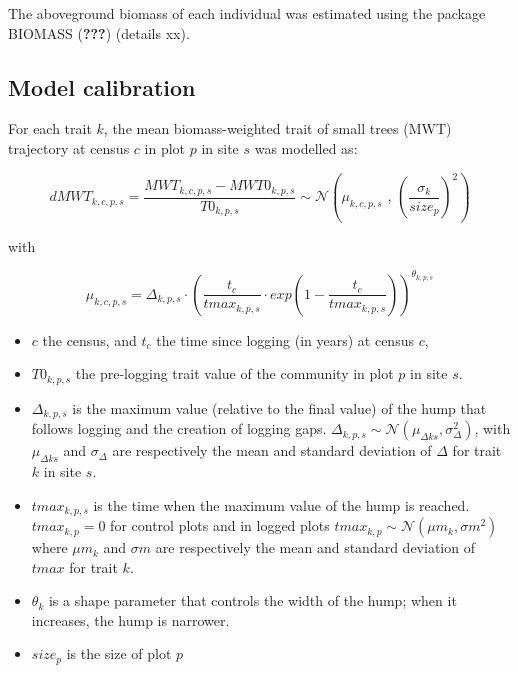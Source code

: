 \documentclass[]{elsarticle} %
\begin{document}
The aboveground biomass of each individual was estimated using the
package BIOMASS ({\textbf{???}}) (details xx).

\subsection{Model calibration}\label{model-calibration}

For each trait \(k\), the mean biomass-weighted trait of small trees
(MWT) trajectory at census \(c\) in plot \(p\) in site \(s\) was
modelled as:

\begin{equation}  
dMWT_{k,c,p,s} = \frac{MWT_{k,c,p,s} - MWT0_{k,p,s}}{T0_{k,p,s}} \sim \mathcal{N}\left( \mu_{k,c,p,s}\text{ , } \left(\frac{\sigma_k}{size_p}\right)^2\right)
\end{equation}

with

\begin{equation}  
\mu_{k,c,p,s} = \Delta_{k,p,s} \cdot \left( \frac{t_c}{tmax_{k,p,s}} \cdot exp\left(1-\frac{t_c}{tmax_{k,p,s}}\right) \right)^{\theta_{k,p,s}}
\end{equation}

\begin{itemize}
\item
  \(c\) the census, and \(t_c\) the time since logging (in years) at
  census \(c\),
\item
  \(T0_{k,p,s}\) the pre-logging trait value of the community in plot
  \(p\) in site \(s\).
\item
  \(\Delta_{k,p,s}\) is the maximum value (relative to the final value)
  of the hump that follows logging and the creation of logging gaps.
  \(\Delta_{k,p,s} \sim \mathcal{N} (\mu_{\Delta ks}, \sigma_{\Delta}^2)\),
  with \(\mu_{\Delta ks}\) and \(\sigma_{\Delta}\) are respectively the
  mean and standard deviation of \(\Delta\) for trait \(k\) in site
  \(s\).
\item
  \(tmax_{k,p,s}\) is the time when the maximum value of the hump is
  reached. \(tmax_{k,p} = 0\) for control plots and in logged plots
  \(tmax_{k,p} \sim \mathcal{N} (\mu m_{ k}, \sigma m^2)\) where
  \(\mu m_{k}\) and \(\sigma m\) are respectively the mean and standard
  deviation of \(tmax\) for trait \(k\).
\item
  \(\theta_k\) is a shape parameter that controls the width of the hump;
  when it increases, the hump is narrower.
\item
  \(size_p\) is the size of plot \(p\)
\end{itemize}
\end{document}
